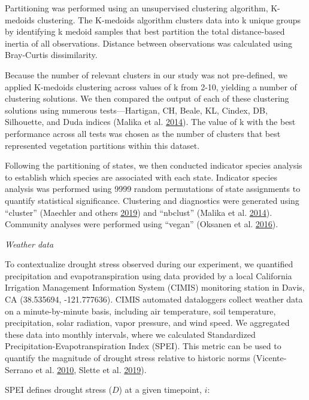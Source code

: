 \documentclass[twoside,12pt,final]{ucthesis-CA2012}
\begin{document}
\begin{ucmainmatter}
Partitioning was performed using an unsupervised clustering algorithm, K-medoids clustering.
The K-medoids algorithm clusters data into k unique groups by identifying k medoid samples that best partition the total distance-based inertia of all observations.
Distance between observations was calculated using Bray-Curtis dissimilarity.

Because the number of relevant clusters in our study was not pre-defined, we applied K-medoids clustering across values of k from 2-10, yielding a number of clustering solutions.
We then compared the output of each of these clustering solutions using numerous tests---Hartigan, CH, Beale, KL, Cindex, DB, Silhouette, and Duda indices (Malika et al. \protect\hyperlink{ref-Charrad2014}{2014}).
The value of k with the best performance across all tests was chosen as the number of clusters that best represented vegetation partitions within this dataset.

Following the partitioning of states, we then conducted indicator species analysis to establish which species are associated with each state.
Indicator species analysis was performed using 9999 random permutations of state assignments to quantify statistical significance.
Clustering and diagnostics were generated using ``cluster'' (Maechler and others \protect\hyperlink{ref-Maechler2019}{2019}) and ``nbclust'' (Malika et al. \protect\hyperlink{ref-Charrad2014}{2014}).
Community analyses were performed using ``vegan'' (Oksanen et al. \protect\hyperlink{ref-Oksanen2016}{2016}).

\emph{Weather data}

To contextualize drought stress observed during our experiment, we quantified precipitation and evapotranspiration using data provided by a local California Irrigation Management Information System (CIMIS) monitoring station in Davis, CA (38.535694, -121.777636).
CIMIS automated dataloggers collect weather data on a minute-by-minute basis, including air temperature, soil temperature, precipitation, solar radiation, vapor pressure, and wind speed.
We aggregated these data into monthly intervals, where we calculated Standardized Precipitation-Evapotranspiration Index (SPEI).
This metric can be used to quantify the magnitude of drought stress relative to historic norms (Vicente-Serrano et al. \protect\hyperlink{ref-Vicente-Serrano2010}{2010}, Slette et al. \protect\hyperlink{ref-Slette2019}{2019}).

SPEI defines drought stress (\(D\)) at a given timepoint, \(i\):


\end{ucmainmatter}
\end{document}
